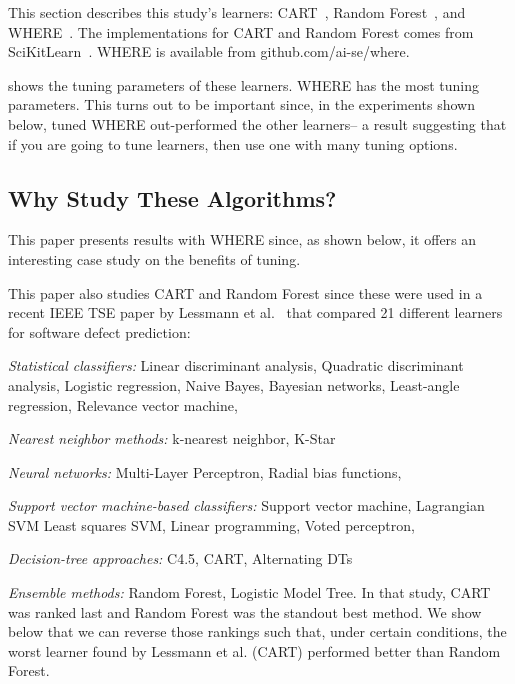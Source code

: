 This section describes this study's learners: CART~\cite{brieman00}, Random Forest~\cite{breiman84}, 
and WHERE~\cite{menzies2013local}.
The implementations
for CART and Random Forest comes from 
SciKitLearn~\cite{scikit-learn}.
WHERE is available from
github.com/ai-se/where.
 
 shows the tuning parameters of these learners.
WHERE has the most tuning parameters. This turns out
to be important since, in the experiments shown below, tuned WHERE 
out-performed the other learners-- a result suggesting that
if you are going to tune learners, then use one with many tuning options.


 
\subsection{Why Study These Algorithms?}


This paper presents results with WHERE since, as shown below,
it offers an interesting case study on the benefits of tuning.

This paper also studies  CART and Random Forest since  these were used in 
a recent IEEE TSE paper by Lessmann et al.~\cite{lessmann2008benchmarking} that compared 21 different 
learners for software defect prediction:
\bi
\item
{\em Statistical classifiers:}
Linear    discriminant analysis,
Quadratic discriminant analysis,
Logistic regression,
Naive Bayes,
Bayesian networks,
Least-angle regression,
Relevance vector machine,

\item
{\em Nearest neighbor methods:}
k-nearest neighbor,
K-Star

\item
{\em Neural networks:}
Multi-Layer Perceptron,
Radial bias functions,

\item
{\em Support vector machine-based classifiers:}
Support vector machine,
Lagrangian SVM
Least squares SVM,
Linear programming,
Voted perceptron,

\item
{\em Decision-tree approaches:}
C4.5,
CART,
Alternating DTs
\item
{\em Ensemble methods:}
Random Forest,
Logistic Model Tree.
\ei
In that study, CART  was ranked last  and Random Forest was
the standout best method.
We show below that we can reverse those rankings such that, under certain conditions,
  the worst learner found by Lessmann et al. (CART) performed better
than Random Forest.
  

